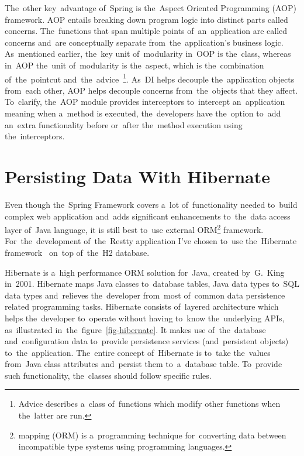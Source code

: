 The~other key~advantage of~Spring is the~Aspect Oriented Programming (AOP)
framework. AOP entails breaking down program logic into distinct parts called
concerns. The~functions that span multiple points of~an~application are called
 concerns and~are conceptually separate from~the~application's
business logic. As~mentioned earlier, the~key unit of~modularity in~OOP is
the~class, whereas in~AOP the~unit of~modularity is the~aspect, which is
the~combination of~the~pointcut and~the~advice~\footnote{Advice describes
a~class of~functions which modify other functions when the~latter are run.}.
As~DI helps decouple the~application objects from~each other, AOP helps decouple
 concerns from~the~objects that they affect. To~clarify,
the~AOP module provides interceptors to~intercept an~application meaning when
a~method is executed, the~developers have the~option to~add an~extra
functionality before or~after the~method execution using the~interceptors.



\section{Persisting Data With Hibernate}
Even though the~Spring Framework covers a~lot of~functionality needed to~build
complex web application and~adds significant enhancements to~the~data access
layer of~Java language, it is still best to~use external
ORM\footnote{ mapping (ORM) is a~programming technique
for~converting data between incompatible type systems using
 programming languages.} framework. For~the~development
of~the~Restty application I've chosen to~use the~Hibernate
framework~\cite{Hibernate} on~top of~the~H2 database.

Hibernate is a~high performance ORM solution for~Java, created by~G.~King
in~2001. Hibernate maps Java classes to~database tables, Java data types to~SQL
data types and~relieves the~developer from~most of~common data persistence
related programming tasks. Hibernate consists of~layered architecture which
helps the~developer to~operate without having to~know the~underlying APIs, as~illustrated in~the~figure~\ref{fig-hibernate}. It
makes use of~the~database and~configuration data to~provide persistence services
(and~persistent objects) to~the~application. The~entire concept of~Hibernate is
to~take the~values from~Java class attributes and~persist them to~a~database
table. To~provide such functionality, the~classes should follow specific rules.


